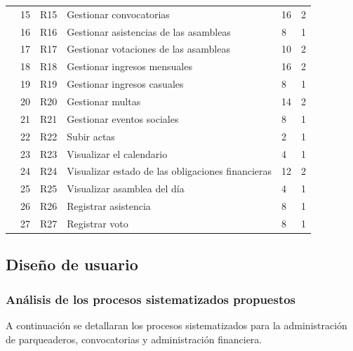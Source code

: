 \begin{footnotesize}
\begin{spacing}{1}
\begin{center}
\begin{longtable}[l]{|p{}|p{}|p{}|p{}| p{}|p{}| }
            \cline{2-6}
             & 15 & R15 & Gestionar convocatorias & 16 & 2 \\
            \cline{2-6}
             & 16 & R16 & Gestionar asistencias de las asambleas & 8 & 1 \\
            \cline{2-6}
             & 17 & R17 & Gestionar votaciones de las asambleas & 10 & 2 \\
            \hline
            \newpage
            \hline
            \multirow{10}{*}{Iteración 3} & 18 & R18 & Gestionar ingresos mensuales & 16 & 2 \\
            \cline{2-6}
             & 19 & R19 & Gestionar ingresos casuales & 8 & 1 \\
            \cline{2-6}
             & 20 & R20 & Gestionar multas & 14 & 2 \\
            \cline{2-6}
             & 21 & R21 & Gestionar eventos sociales & 8 & 1 \\
            \cline{2-6}
             & 22 & R22 & Subir actas & 2 & 1 \\
            \cline{2-6}
             & 23 & R23 & Visualizar el calendario & 4 & 1 \\
            \cline{2-6}
             & 24 & R24 & Visualizar estado de las obligaciones financieras & 12 & 2 \\
            \cline{2-6}
             & 25 & R25 & Visualizar asamblea del día & 4 & 1 \\
            \cline{2-6}
             & 26 & R26 & Registrar asistencia & 8 & 1 \\
            \cline{2-6}
             & 27 & R27 & Registrar voto & 8 & 1 \\
            \hline
        \end{longtable}
    \end{center}
\end{spacing}
\end{footnotesize}
\subsection{Diseño de usuario} \label{subsec:diseno-usuario}
\subsubsection{Análisis de los procesos sistematizados propuestos}

A continuación se detallaran los procesos sistematizados para la administración de parqueaderos, convocatorias y administración financiera.

